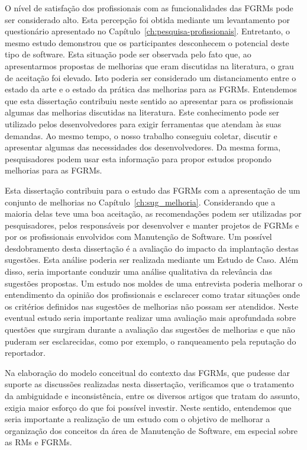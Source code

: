 O nível de satisfação dos profissionais com as funcionalidades das FGRMs pode
ser considerado alto. Esta percepção foi obtida mediante um levantamento por
questionário apresentado no Capítulo~\ref{ch:pesquisa-profissionais}.
Entretanto, o mesmo estudo demonstrou que os participantes desconhecem o
potencial deste tipo de software. Esta situação pode ser observada pelo fato
que, ao apresentarmos propostas de melhorias que eram discutidas na literatura,
o grau de aceitação foi elevado. Isto poderia ser considerado um distanciamento
entre o estado da arte e o estado da prática das melhorias para as FGRMs.
Entendemos que esta dissertação contribuiu neste sentido ao apresentar para os
profissionais algumas das melhorias discutidas na literatura. Este conhecimento
pode ser utilizado pelos desenvolvedores para exigir ferramentas que atendam às
suas demandas. Ao mesmo tempo, o nosso trabalho conseguiu coletar, discutir e
apresentar algumas das necessidades dos desenvolvedores. Da mesma forma,
pesquisadores podem usar esta informação para propor estudos propondo melhorias
para as FGRMs.

Esta dissertação contribuiu para o estudo das FGRMs com a apresentação de um
conjunto de melhorias no Capítulo~\ref{ch:sug_melhoria}. Considerando que a
maioria delas teve uma boa aceitação, as recomendações podem ser utilizadas por
pesquisadores, pelos responsáveis por desenvolver e manter projetos de FGRMs e
por os profissionais envolvidos com Manutenção de Software. Um possível
desdobramento desta dissertação é a avaliação do impacto da implantação destas
sugestões. Esta análise poderia ser realizada mediante um Estudo de Caso. Além
disso, seria importante conduzir uma análise qualitativa da relevância das
sugestões propostas. Um estudo nos moldes de uma entrevista poderia melhorar o
entendimento da opinião dos profissionais e esclarecer como tratar situações
onde os critérios definidos nas sugestões de melhorias não possam ser
atendidos. Neste eventual estudo seria importante realizar uma avaliação mais
aprofundada sobre questões que surgiram durante a avaliação das sugestões de
melhorias e que não puderam ser esclarecidas, como por exemplo, o ranqueamento
pela reputação do reportador.

Na elaboração do modelo conceitual do contexto das FGRMs, que pudesse dar
suporte as discussões realizadas nesta dissertação, verificamos que o
tratamento da ambiguidade e inconsistência, entre os diversos artigos que
tratam do assunto, exigia maior esforço do que foi possível investir. Neste
sentido, entendemos que seria importante a realização de um estudo com o
objetivo de melhorar a organização dos conceitos da área de Manutenção de
Software, em especial sobre as RMs e FGRMs.

